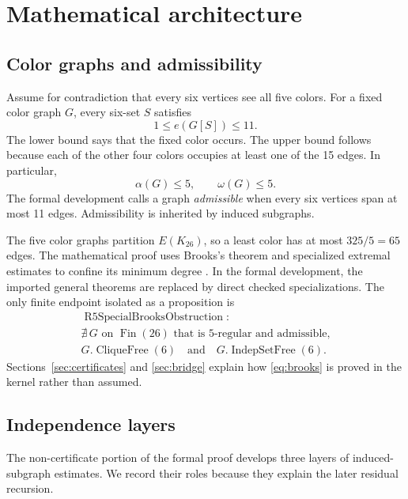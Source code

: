 \documentclass[11pt,reqno,a4paper]{amsart}
\theoremstyle{definition}
\theoremstyle{remark}
\newcommand{\Fin}{\operatorname{Fin}}
\newcommand{\IndepFree}{\operatorname{IndepSetFree}}
\newcommand{\CliqueFree}{\operatorname{CliqueFree}}
\begin{document}
\section{Mathematical architecture}

\subsection{Color graphs and admissibility}

Assume for contradiction that every six vertices see all five colors.
For a fixed color graph \(G\), every six-set \(S\) satisfies
\begin{equation}\label{eq:local}
  1\le e(G[S])\le11.
\end{equation}
The lower bound says that the fixed color occurs.  The upper bound follows
because each of the other four colors occupies at least one of the 15
edges.  In particular,
\[
  \alpha(G)\le5,\qquad \omega(G)\le5.
\]
The formal development calls a graph \emph{admissible} when every six
vertices span at most 11 edges.  Admissibility is inherited by induced
subgraphs.

The five color graphs partition \(E(K_{26})\), so a least color has at most
\(325/5=65\) edges.  The mathematical proof uses Brooks's theorem and
specialized extremal estimates to confine its minimum degree
\cite{Brooks1941,KangPikhurko2005,Sneiderman2026}.  In the formal
development, the imported general theorems are replaced by direct checked
specializations.  The only finite endpoint isolated as a proposition is
\begin{equation}\label{eq:brooks}
\begin{gathered}
\operatorname{R5SpecialBrooksObstruction}:\\
\nexists\,G\text{ on }\Fin(26)\text{ that is 5-regular and admissible,}\\
G.\CliqueFree(6)\quad\text{and}\quad G.\IndepFree(6).
\end{gathered}
\end{equation}
Sections~\ref{sec:certificates} and \ref{sec:bridge} explain how
\eqref{eq:brooks} is proved in the kernel rather than assumed.

\subsection{Independence layers}

The non-certificate portion of the formal proof develops three layers of
induced-subgraph estimates.  We record their roles because they explain the
later residual recursion.
\end{document}
